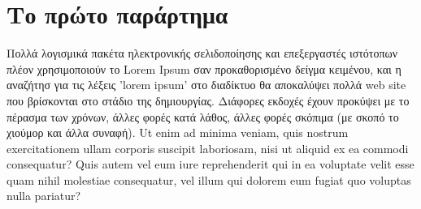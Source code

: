 \chapter{Το πρώτο παράρτημα}
    Πολλά λογισμικά πακέτα ηλεκτρονικής σελιδοποίησης και επεξεργαστές ιστότοπων πλέον χρησιμοποιούν το Lorem Ipsum σαν
    προκαθορισμένο δείγμα κειμένου, και η αναζήτησ για τις λέξεις 'lorem ipsum' στο διαδίκτυο θα αποκαλύψει πολλά web site
    που βρίσκονται στο στάδιο της δημιουργίας. Διάφορες εκδοχές έχουν προκύψει με το πέρασμα των χρόνων, άλλες φορές κατά
    λάθος, άλλες φορές σκόπιμα (με σκοπό το χιούμορ και άλλα συναφή). Ut enim ad minima veniam, quis
    nostrum exercitationem ullam corporis suscipit laboriosam, nisi ut aliquid ex ea commodi
    consequatur? Quis autem vel eum iure reprehenderit qui in ea voluptate velit esse quam nihil
    molestiae consequatur, vel illum qui dolorem eum fugiat quo voluptas nulla pariatur?
